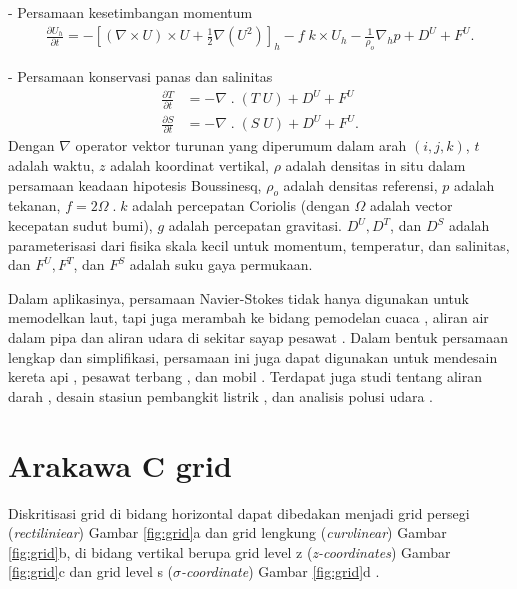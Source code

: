 \begin{spacing}{1.5}
	- Persamaan kesetimbangan momentum
	\begin{equation}\label{eq:P2}
		\begin{aligned}
			\frac{\partial U_h}{\partial t} = - \left[(\nabla \times U) \times U + \frac{1}{2}\nabla (U^2)\right]_h - f \; k \times U_h - \frac{1}{\rho_o}\nabla_h p + D^U + F^U.
		\end{aligned}
	\end{equation}

	- Persamaan konservasi panas dan salinitas
	\begin{equation}\label{eq:P3}
		\begin{aligned}
			\frac{\partial T}{\partial t} &= - \nabla \; . \; (T\;U)  + D^U + F^U \\
			\frac{\partial S}{\partial t} &= - \nabla \; . \; (S\;U)  + D^U + F^U.
		\end{aligned}
	\end{equation}
	Dengan $\nabla$ operator vektor turunan yang diperumum dalam arah $(i,j,k)$, $t$ adalah waktu, $z$ adalah koordinat vertikal, $\rho$ adalah densitas in situ dalam persamaan keadaan hipotesis Boussinesq, $\rho_o$ adalah densitas referensi, $p$ adalah tekanan, $f = 2\Omega\; . \;k$ adalah percepatan Coriolis (dengan $\Omega$ adalah vector kecepatan sudut bumi), $g$ adalah percepatan gravitasi. $D^U, D^T$, dan $D^S$ adalah parameterisasi dari fisika skala kecil  untuk momentum, temperatur, dan salinitas, dan $F^U,F^T$, dan $F^S$ adalah suku gaya permukaan.
	 
	Dalam aplikasinya, persamaan Navier-Stokes tidak hanya digunakan untuk memodelkan laut, tapi juga merambah ke bidang pemodelan cuaca , aliran air dalam pipa  dan aliran udara di sekitar sayap pesawat . Dalam bentuk persamaan lengkap dan simplifikasi, persamaan ini juga dapat digunakan untuk mendesain kereta api , pesawat terbang , dan mobil . Terdapat juga studi tentang aliran darah , desain stasiun pembangkit listrik , dan analisis polusi udara . 

\section[Arakawa C grid]{Arakawa C grid}
	Diskritisasi grid di bidang horizontal dapat dibedakan menjadi grid persegi (\textit{rectiliniear}) Gambar \ref{fig:grid}a dan grid lengkung (\textit{curvlinear}) Gambar \ref{fig:grid}b, di bidang vertikal berupa grid level z (\textit{z-coordinates}) Gambar \ref{fig:grid}c dan grid level s (\textit{$\sigma$-coordinate}) Gambar \ref{fig:grid}d .
	

\end{spacing}
